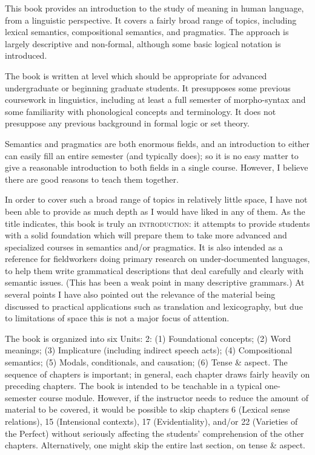 \begin{refsection}

This book provides an introduction to the study of meaning in human language, from a linguistic perspective. It covers a fairly broad range of topics, including lexical semantics, compositional semantics, and pragmatics. The approach is largely descriptive and non-formal, although some basic logical notation is introduced.


The book is written at level which should be appropriate for advanced undergraduate or beginning graduate students. It presupposes some previous coursework in linguistics, including at least a full semester of morpho-syntax and some familiarity with phonological concepts and terminology. It does not presuppose any previous background in formal logic or set theory.



Semantics and pragmatics are both enormous fields, and an introduction to either can easily fill an entire semester (and typically does); so it is no easy matter to give a reasonable introduction to both fields in a single course. However, I believe there are good reasons to teach them together.



In order to cover such a broad range of topics in relatively little space, I have not been able to provide as much depth as I would have liked in any of them. As the title indicates, this book is truly an \textsc{introduction}: it attempts to provide students with a solid foundation which will prepare them to take more advanced and specialized courses in semantics and/or pragmatics. It is also intended as a reference for fieldworkers doing primary research on under-documented languages, to help them write grammatical descriptions that deal carefully and clearly with semantic issues. (This has been a weak point in many descriptive grammars.) At several points I have also pointed out the relevance of the material being discussed to practical applications such as translation and lexicography, but due to limitations of space this is not a major focus of attention.



The book is organized into six Units: 2: (1) Foundational concepts; (2) Word meanings; (3) Implicature (including indirect speech acts); (4) Compositional semantics; (5) Modals, conditionals, and causation; (6) Tense \& aspect. The sequence of chapters is important; in general, each chapter draws fairly heavily on preceding chapters. The book is intended to be teachable in a typical one-semester course module. However, if the instructor needs to reduce the amount of material to be covered, it would be possible to skip chapters 6 (Lexical sense relations), 15 (Intensional contexts), 17 (Evidentiality), and/or 22 (Varieties of the Perfect) without seriously affecting the students’ comprehension of the other chapters. Alternatively, one might skip the entire last section, on tense \& aspect.




\end{refsection}
